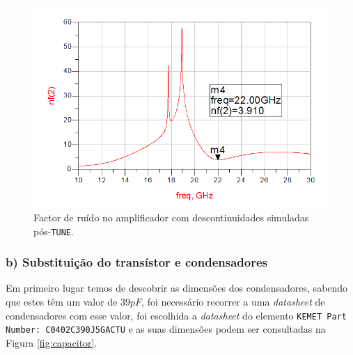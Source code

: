 \documentclass[11pt]{article}
\numberwithin{equation}{section}
\begin{document}
\begin{figure}[H]
	\centering
	\includegraphics[keepaspectratio=true, scale=0.45]{exps/descont_noise_pos_tune}
	\vspace{-0.5em}
	\caption{Factor de ruído no amplificador com descontinuidades simuladas pós-\texttt{TUNE}.}
	\vspace{-0.8em}
	\label{fig:descont_noise_pos_tune}
\end{figure}



\subsubsection{b) Substituição do transístor e condensadores}

Em primeiro lugar temos de descobrir as dimensões dos condensadores, sabendo que estes têm um valor de $ 39 pF $, foi necessário recorrer a uma \textit{datasheet} de condensadores com esse valor, foi escolhida a \textit{datasheet} do elemento \texttt{KEMET Part Number: C0402C390J5GACTU} e as suas dimensões podem ser consultadas na Figura \ref{fig:capacitor}.
\end{document}
